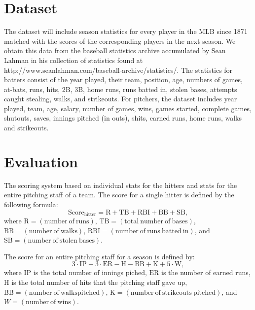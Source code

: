 \documentclass[12pt]{amsart}
\begin{document}
\section{\large Dataset}
The dataset will include season statistics for every player in the MLB since 1871 matched with the scores of the corresponding players in the next season. We obtain this data from the baseball statistics archive accumulated by Sean Lahman in his collection of statistics found at http://www.seanlahman.com/baseball-archive/statistics/. The statistics for batters consist of the year played, their team, position, age, numbers of games, at-bats, runs, hits, 2B, 3B, home runs, runs batted in, stolen bases, attempts caught stealing, walks, and strikeouts. For pitchers, the dataset includes year played, team, age, salary, number of games, wins, games started, complete games, shutouts, saves, innings pitched (in outs), shits, earned runs, home runs, walks and strikeouts.

\section{\large Evaluation}
\label{eval}
The scoring system based on individual stats for the hitters and stats for the entire pitching staff of a team. The score for a single hitter is defined by the following formula:
\begin{equation}
\mathrm{Score_{hitter}} = \mathrm{R} + \mathrm{TB} + \mathrm{RBI} + \mathrm{BB} + \mathrm{SB},
\end{equation}
where 
$\mathrm{R}= (\mathrm{number\ of\ runs})$, $\mathrm{TB} = (\mathrm{total\ number\ of\ bases})$, $\mathrm{BB} = (\mathrm{number\ of\ walks})$, $\mathrm{RBI} = (\mathrm{number\ of\ runs\ batted\ in})$, and $\mathrm{SB} = (\mathrm{number\ of\ stolen\ bases})$. 
\vspace{.4cm}

The score for an entire pitching staff for a season is defined by:
\begin{equation}
3\cdot \mathrm{IP} - 3\cdot \mathrm{ER} - \mathrm{H} - \mathrm{BB} + \mathrm{K} + 5 \cdot \mathrm{W},
\end{equation}
where $\mathrm{IP}$ is the total number of innings piched, $\mathrm{ER}$ is the number of earned runs, $\mathrm{H}$ is the total number of hits that the pitching staff gave up, $\mathrm{BB} = (\mathrm{number\ of\ walks pitched})$, $\mathrm{K} = (\mathrm{number\ of\ strikeouts\ pitched})$, and $W = (\mathrm{number\ of\ wins})$.
\vspace{.4cm}
\end{document}
